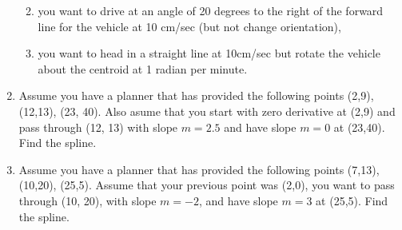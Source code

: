 \begin{enumerate}
  \begin{enumerate}
  \def\labelenumii{\alph{enumii}.}
  \tightlist
  \item
    you want to drive at an angle of 20 degrees to the right of the
    forward line for the vehicle at 10 cm/sec (but not change
    orientation),
  \item
    you want to head in a straight line at 10cm/sec but rotate the
    vehicle about the centroid at 1 radian per minute.
  \end{enumerate}
\item
  Assume you have a planner that has provided the following points
  (2,9), (12,13), (23, 40). Also asume that you start with zero
  derivative at (2,9) and pass through (12, 13) with slope \(m = 2.5\)
  and have slope \(m = 0\) at (23,40). Find the spline.
\item
  Assume you have a planner that has provided the following points
  (7,13), (10,20), (25,5). Assume that your previous point was (2,0),
  you want to pass through (10, 20), with slope \(m = -2\), and have
  slope \(m = 3\) at (25,5). Find the spline.
\end{enumerate}
